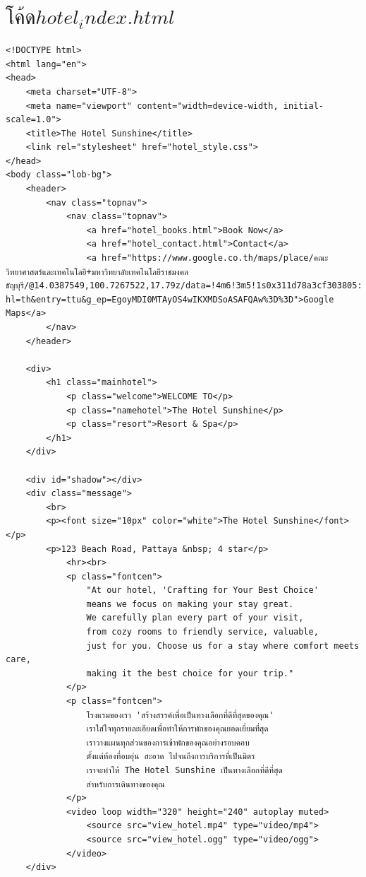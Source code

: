 \documentclass{report}
\begin{document}
\section{$โค้ดhotel_index.html$}
\begin{verbatim}
<!DOCTYPE html>
<html lang="en">
<head>
    <meta charset="UTF-8">
    <meta name="viewport" content="width=device-width, initial-scale=1.0">
    <title>The Hotel Sunshine</title>
    <link rel="stylesheet" href="hotel_style.css">
</head>
<body class="lob-bg">
    <header>
        <nav class="topnav">
            <nav class="topnav">
                <a href="hotel_books.html">Book Now</a>
                <a href="hotel_contact.html">Contact</a>
                <a href="https://www.google.co.th/maps/place/คณะวิทยาศาสตร์และเทคโนโลยี+มหาวิทยาลัยเทคโนโลยีราชมงคลธัญบุรี/@14.0387549,100.7267522,17.79z/data=!4m6!3m5!1s0x311d78a3cf303805:0x298cef6207b64026!8m2!3d14.0395596!4d100.7289406!16s%2Fg%2F12nvpzlcn?hl=th&entry=ttu&g_ep=EgoyMDI0MTAyOS4wIKXMDSoASAFQAw%3D%3D">Google Maps</a>
        </nav>
    </header>

    <div>
        <h1 class="mainhotel">
            <p class="welcome">WELCOME TO</p>
            <p class="namehotel">The Hotel Sunshine</p>
            <p class="resort">Resort & Spa</p>
        </h1>
    </div>

    <div id="shadow"></div>
    <div class="message">
        <br>
        <p><font size="10px" color="white">The Hotel Sunshine</font></p>
        <p>123 Beach Road, Pattaya &nbsp; 4 star</p>
            <hr><br>
            <p class="fontcen">
                "At our hotel, 'Crafting for Your Best Choice' 
                means we focus on making your stay great.
                We carefully plan every part of your visit, 
                from cozy rooms to friendly service, valuable,
                just for you. Choose us for a stay where comfort meets care,
                making it the best choice for your trip."
            </p>
            <p class="fontcen">
                โรงแรมของเรา 'สร้างสรรค์เพื่อเป็นทางเลือกที่ดีที่สุดของคุณ'
                เราใส่ใจทุกรายละเอียดเพื่อทำให้การพักของคุณยอดเยี่ยมที่สุด 
                เราวางแผนทุกส่วนของการเข้าพักของคุณอย่างรอบคอบ
                ตั้งแต่ห้องที่อบอุ่น สะอาด ไปจนถึงการบริการที่เป็นมิตร
                เราจะทำให้ The Hotel Sunshine เป็นทางเลือกที่ดีที่สุด
                สำหรับการเดินทางของคุณ     
            </p>
            <video loop width="320" height="240" autoplay muted>
                <source src="view_hotel.mp4" type="video/mp4">
                <source src="view_hotel.ogg" type="video/ogg">
            </video>
    </div>
      

\end{verbatim}
\end{document}
